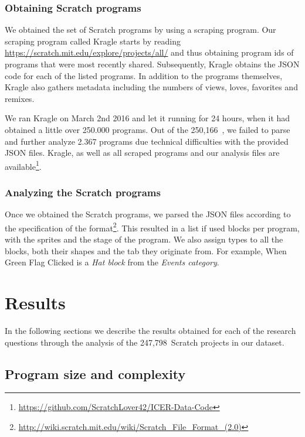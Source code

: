 \documentclass{sig-alternate}
\newcommand{\nPrograms}{250,166}
\newcommand{\nAnalyzedPrograms}{247,798}
\begin{document}
\subsubsection{Obtaining Scratch programs}
We obtained the set of Scratch programs by using a scraping program. Our scraping program called Kragle starts by reading \url{https://scratch.mit.edu/explore/projects/all/} and thus obtaining program ids of programs that were most recently shared. Subsequently, Kragle obtains the JSON code for each of the listed programs. In addition to the programs themselves, Kragle also gathers metadata including the numbers of views, loves, favorites and remixes.


We ran Kragle on March 2nd 2016 and let it running for 24 hours, when it had obtained a little over 250.000 programs.  Out of the \nPrograms~, we failed to parse and further analyze 2.367 programs due technical difficulties with the provided JSON files. Kragle, as well as all scraped programs and our analysis files are available\footnote{\url{https://github.com/ScratchLover42/ICER-Data-Code}}.

\subsubsection{Analyzing the Scratch programs}
Once we obtained the Scratch programs, we parsed the JSON files according to the specification of the format\footnote{\url{http://wiki.scratch.mit.edu/wiki/Scratch_File_Format_(2.0)}}. This resulted in a list if used blocks per program, with the sprites and the stage of the program. We also assign types to all the blocks, both their shapes and the tab they originate from. For example, When Green Flag Clicked is a \emph{Hat block} from the \emph{Events category}.


\section{Results}
\label{sec:results}
In the following sections we describe the results obtained for each of the research questions through the analysis of the \nAnalyzedPrograms~Scratch projects in our dataset.

\subsection{Program size and complexity}
\end{document}
